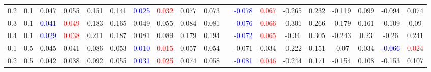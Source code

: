 \documentclass[specialist,
substylefile = spbu_report.rtx,
subf,href,colorlinks=true, 12pt]{disser}
\theoremstyle{definition}
\begin{document}
\begin{table}
{\begin{tabular}{m{1cm}m{1cm}ccccccccm{0.2cm}cccccccc}
			0.2 & 0.1    & 0.047                                   & 0.055                                      & 0.151                               & 0.141                       & \textcolor{blue}{0.025} & \textcolor{red}{0.032}                  & 0.077                                      & 0.073                    &                             & \textcolor{blue}{-0.078} & \textcolor{red}{0.067} & -0.265                   & 0.232      & -0.119                   & 0.099                   & -0.094                   & 0.074                  \\
			0.3 & 0.1    & \textcolor{blue}{0.041}                 & \textcolor{red}{0.049}                     & 0.183                               & 0.165                       & 0.049                   & 0.055                                   & 0.084                                      & 0.081                    &                             & \textcolor{blue}{-0.076} & \textcolor{red}{0.066} & -0.301                   & 0.266      & -0.179                   & 0.161                   & -0.109                   & 0.09                   \\
			0.4 & 0.1    & \textcolor{blue}{0.029}                 & \textcolor{red}{0.038}                     & 0.211                               & 0.187                       & 0.081                   & 0.089                                   & 0.179                                      & 0.194                    &                             & \textcolor{blue}{-0.072} & \textcolor{red}{0.065} & -0.34                    & 0.305      & -0.243                   & 0.23                    & -0.26                    & 0.241                  \\
			\hline
			0.1 & 0.5    & 0.045                                   & 0.041                                      & 0.086                               & 0.053                       & \textcolor{blue}{0.010} & \textcolor{red}{0.015}                  & 0.057                                      & 0.054                    &                             & -0.071                   & 0.034                  & -0.222                   & 0.151      & -0.07                    & 0.034                   & \textcolor{blue}{-0.066} & \textcolor{red}{0.024} \\
			0.2 & 0.5    & 0.042                                   & 0.038                                      & 0.092                               & 0.055                       & \textcolor{blue}{0.031} & \textcolor{red}{0.025}                  & 0.074                                      & 0.058                    &                             & \textcolor{blue}{-0.081} & \textcolor{red}{0.046} & -0.244                   & 0.171      & -0.154                   & 0.108                   & -0.153                   & 0.107                  \\

\end{tabular}}
\end{table}
\end{document}
